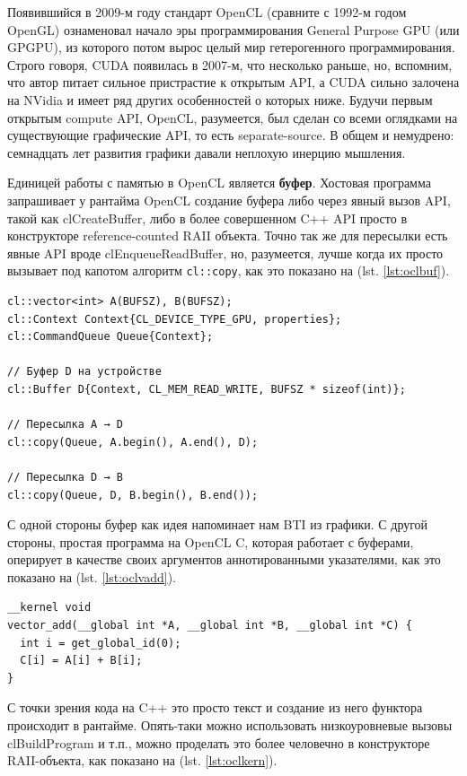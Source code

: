 \documentclass[a4paper,12pt,oneside]{article}
\begin{document}
Появившийся в 2009-м году стандарт OpenCL (сравните с 1992-м годом OpenGL) ознаменовал начало эры программирования General Purpose GPU (или GPGPU), из которого потом вырос целый мир гетерогенного программирования.
Строго говоря, CUDA появилась в 2007-м, что несколько раньше, но, вспомним, что автор питает сильное пристрастие к открытым API, а CUDA сильно залочена на NVidia и имеет ряд других особенностей о которых ниже.
Будучи первым открытым compute API, OpenCL, разумеется, был сделан со всеми оглядками на существующие графические API, то есть separate-source. В общем и немудрено: семнадцать лет развития графики давали неплохую инерцию мышления.

Единицей работы с памятью в OpenCL является \textbf{буфер}.
Хостовая программа запрашивает у рантайма OpenCL создание буфера либо через явный вызов API, такой как clCreateBuffer, либо в более совершенном C++ API просто в конструкторе reference-counted RAII объекта.
Точно так же для пересылки есть явные API вроде clEnqueueReadBuffer, но, разумеется, лучше когда их просто вызывает под капотом алгоритм \lstinline!cl::copy!, как это показано на (lst. \ref{lst:oclbuf}).

\begin{lstlisting}[caption={Пересылка буфера, OpenCL},label={lst:oclbuf}]
cl::vector<int> A(BUFSZ), B(BUFSZ);
cl::Context Context{CL_DEVICE_TYPE_GPU, properties};
cl::CommandQueue Queue{Context};

// Буфер D на устройстве
cl::Buffer D{Context, CL_MEM_READ_WRITE, BUFSZ * sizeof(int)};

// Пересылка A → D
cl::copy(Queue, A.begin(), A.end(), D);

// Пересылка D → B
cl::copy(Queue, D, B.begin(), B.end());
\end{lstlisting}

С одной стороны буфер как идея напоминает нам BTI из графики. С другой стороны, простая программа на OpenCL C, которая работает с буферами, оперирует в качестве своих аргументов аннотированными указателями, как это показано на (lst. \ref{lst:oclvadd}).

\begin{lstlisting}[caption={Векторное сложение, OpenCL},label={lst:oclvadd}]
__kernel void
vector_add(__global int *A, __global int *B, __global int *C) {
  int i = get_global_id(0);
  C[i] = A[i] + B[i];
}
\end{lstlisting}

С точки зрения кода на C++ это просто текст и создание из него функтора происходит в рантайме.
Опять-таки можно использовать низкоуровневые вызовы clBuildProgram и т.п., можно проделать это более человечно в конструкторе RAII-объекта, как показано на (lst. \ref{lst:oclkern}).
\end{document}
